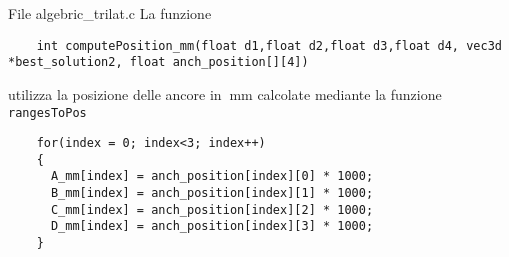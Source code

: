 \begin{frame}[fragile]{File algebric\_trilat.c}
  La funzione
  \begin{lstlisting}
    int computePosition_mm(float d1,float d2,float d3,float d4, vec3d *best_solution2, float anch_position[][4])
  \end{lstlisting}
  utilizza la posizione delle ancore in $\SI{}{\milli\meter}$ calcolate mediante la funzione \lstinline!rangesToPos!
  \begin{lstlisting}
    for(index = 0; index<3; index++)
    {
      A_mm[index] = anch_position[index][0] * 1000;
      B_mm[index] = anch_position[index][1] * 1000;
      C_mm[index] = anch_position[index][2] * 1000;
      D_mm[index] = anch_position[index][3] * 1000;
    }
  \end{lstlisting}
\end{frame}
